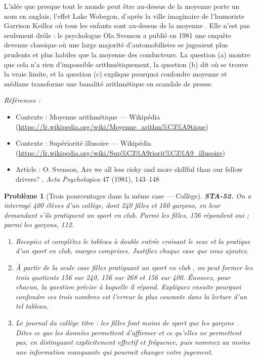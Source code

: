 \documentclass[11pt]{article}
\newtheorem{problem}{Problème}
\newenvironment{refs}{\par\small\noindent\emph{Références :}\begin{itemize}\setlength\itemsep{0pt}}{\end{itemize}\normalsize}
\begin{document}
\noindent L'idée que presque tout le monde peut être au-dessus de la moyenne porte un nom
en anglais, l'effet Lake Wobegon, d'après la ville imaginaire de l'humoriste Garrison Keillor \og{} où
tous les enfants sont au-dessus de la moyenne \fg{}. Elle n'est pas seulement drôle : le psychologue Ola
Svenson a publié en 1981 une enquête devenue classique où une large majorité d'automobilistes se
jugeaient plus prudents et plus habiles que la moyenne des conducteurs. La question (a) montre que
cela n'a rien d'impossible arithmétiquement, la question (b) dit où se trouve la vraie limite, et
la question (c) explique pourquoi confondre moyenne et médiane transforme une banalité
arithmétique en scandale de presse.

\begin{refs}
\item Contexte : Moyenne arithmétique --- Wikipédia (\url{https://fr.wikipedia.org/wiki/Moyenne_arithm%C3%A9tique})
\item Contexte : Supériorité illusoire --- Wikipédia (\url{https://fr.wikipedia.org/wiki/Sup%C3%A9riorit%C3%A9_illusoire})
\item Article : O. Svenson, \og{} Are we all less risky and more skillful than our fellow drivers? \fg{}, \textit{Acta Psychologica} 47 (1981), 143--148
\end{refs}

\bigskip

\begin{problem}[{Trois pourcentages dans la même case --- Collège}]
\textbf{STA-52.} On a interrogé 400 élèves d'un collège, dont 240 filles et 160 garçons, en
leur demandant s'ils pratiquent un sport en club. Parmi les filles, 156 répondent oui ; parmi les
garçons, 112.
\begin{enumerate}
\item[(a)] Recopiez et complétez le tableau à double entrée croisant le sexe et la pratique d'un sport en
club, marges comprises. Justifiez chaque case que vous ajoutez.
\item[(b)] À partir de la seule case \og{} filles pratiquant un sport en club \fg{}, on peut former les trois
quotients 156 sur 240, 156 sur 268 et 156 sur 400. Énoncez, pour chacun, la question précise à
laquelle il répond. Expliquez ensuite pourquoi confondre ces trois nombres est l'erreur la plus
courante dans la lecture d'un tel tableau.
\item[(c)] Le journal du collège titre : \og{} les filles font moins de sport que les garçons \fg{}. Dites ce que
les données permettent d'affirmer et ce qu'elles ne permettent pas, en distinguant explicitement
effectif et fréquence, puis nommez au moins une information manquante qui pourrait changer votre
jugement.
\end{enumerate}

\end{problem}
\end{document}
